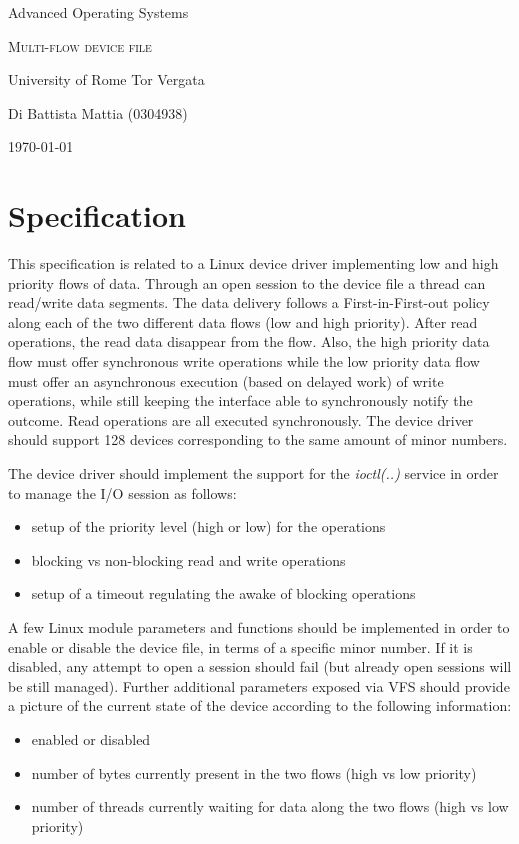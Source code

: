 \documentclass[12pt]{report}
\newcommand*{\myTitle}{\begingroup 
	\centering 
	\vspace*{\baselineskip} 
	
	
	{\LARGE Advanced Operating Systems}%
	\vspace*{1\baselineskip}
	
	\scshape %
	Multi-flow device file
	
	\vspace*{1\baselineskip}
	University of Rome Tor Vergata\\[\baselineskip]
	
	
	\vspace*{5\baselineskip} 
	
	{\large Di Battista Mattia (0304938)\par} 
	
	\vspace*{1\baselineskip}
	\today
	
	\endgroup\clearpage}
\begin{document}
\begin{titlingpage}
\myTitle
\end{titlingpage}
\tableofcontents

\chapter{Specification}

This specification is related to a Linux device driver implementing low and high priority flows of data.
Through an open session to the device file a thread can read/write data segments. The data delivery
follows a First-in-First-out policy along each of the two different data flows (low and high priority). After
read operations, the read data disappear from the flow. Also, the high priority data flow must offer
synchronous write operations while the low priority data flow must offer an asynchronous execution
(based on delayed work) of write operations, while still keeping the interface able to synchronously notify
the outcome. Read operations are all executed synchronously. The device driver should support 128
devices corresponding to the same amount of minor numbers.

The device driver should implement the support for the \emph{ioctl(..)} service in order to manage the I/O session
as follows:
\begin{itemize}
\item setup of the priority level (high or low) for the operations
\item blocking vs non-blocking read and write operations
\item setup of a timeout regulating the awake of blocking operations
\end{itemize}

A few Linux module parameters and functions should be implemented in order to enable or disable the
device file, in terms of a specific minor number. If it is disabled, any attempt to open a session should fail
(but already open sessions will be still managed). Further additional parameters exposed via VFS should
provide a picture of the current state of the device according to the following information:
\begin{itemize}
\item enabled or disabled
\item number of bytes currently present in the two flows (high vs low priority)
\item number of threads currently waiting for data along the two flows (high vs low priority)
\end{itemize}
\end{document}
